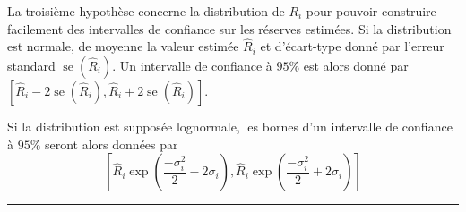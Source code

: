 \begin{f}
%

		

La troisième hypothèse concerne la distribution de \(R_{i}\) pour pouvoir construire facilement des intervalles de confiance sur les réserves estimées. Si  la distribution est normale, de moyenne la valeur estimée \(\hat{R}_{i}\) et d'écart-type donné par l'erreur standard \(\operatorname{se}\left(\hat{R}_{i}\right)\). Un intervalle de confiance à \(95 \%\) est alors donné par \(\left[\hat{R}_{i}-2 \operatorname{se}\left(\hat{R}_{i}\right), \hat{R}_{i}+2 \operatorname{se}\left(\hat{R}_{i}\right)\right]\).

Si la distribution est supposée lognormale, les bornes d'un intervalle de confiance à \(95 \%\) seront alors données par
\[
\left[\hat{R}_{i} \exp \left(\frac{-\sigma_{i}^{2}}{2}-2 \sigma_{i}\right), \hat{R}_{i} \exp \left(\frac{-\sigma_{i}^{2}}{2}+2 \sigma_{i}\right)\right]
\]
		
\end{f}
\hrule


